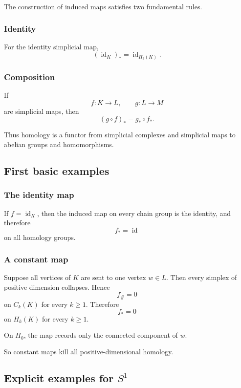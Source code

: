 \documentclass[12pt,a4paper]{article}
\theoremstyle{notespace}
\begin{document}
The construction of induced maps satisfies two fundamental rules.

\subsubsection{Identity}

For the identity simplicial map,
\[
(\operatorname{id}_K)_*=\operatorname{id}_{H_k(K)}.
\]

\subsubsection{Composition}

If
\[
f:K\to L,\qquad g:L\to M
\]
are simplicial maps, then
\[
(g\circ f)_*=g_*\circ f_*.
\]

Thus homology is a functor from simplicial complexes and simplicial maps to abelian groups and homomorphisms.

\subsection{First basic examples}

\subsubsection{The identity map}

If \(f=\operatorname{id}_K\), then the induced map on every chain group is the identity, and therefore
\[
f_*=\operatorname{id}
\]
on all homology groups.

\subsubsection{A constant map}

Suppose all vertices of \(K\) are sent to one vertex \(w\in L\). Then every simplex of positive dimension collapses. Hence
\[
f_\#=0
\]
on \(C_k(K)\) for every \(k\ge 1\). Therefore
\[
f_*=0
\]
on \(H_k(K)\) for every \(k\ge 1\).

On \(H_0\), the map records only the connected component of \(w\).

So constant maps kill all positive-dimensional homology.

\subsection{Explicit examples for \texorpdfstring{$S^1$}{S1}}
\end{document}
